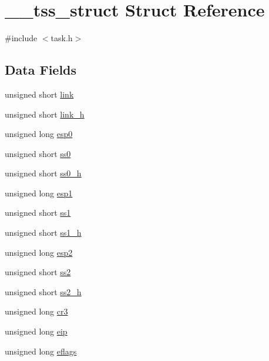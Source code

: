 \hypertarget{struct____tss__struct}{}\section{\+\_\+\+\_\+tss\+\_\+struct Struct Reference}
\label{struct____tss__struct}


{\ttfamily \#include $<$task.\+h$>$}

\subsection*{Data Fields}
\begin{DoxyCompactItemize}
\item 
unsigned short \hyperlink{struct____tss__struct_ae95a2fc5b42ac4b190cb4c340dfe0ab2}{link}
\item 
unsigned short \hyperlink{struct____tss__struct_a09d41cf0b65451fe0238b32ae9797bf0}{link\+\_\+h}
\item 
unsigned long \hyperlink{struct____tss__struct_a7d2c471a5e5070e75f2b11c70fa3374c}{esp0}
\item 
unsigned short \hyperlink{struct____tss__struct_a64d13cf91ec122ec8ed42917b9dd471b}{ss0}
\item 
unsigned short \hyperlink{struct____tss__struct_a06f3d0a7a04074ed8772d8ee810c9a38}{ss0\+\_\+h}
\item 
unsigned long \hyperlink{struct____tss__struct_a0c8844d2b2cd289b6d8b91cb37089592}{esp1}
\item 
unsigned short \hyperlink{struct____tss__struct_a1c405de895c4eb4ffe2930361aa252d3}{ss1}
\item 
unsigned short \hyperlink{struct____tss__struct_a3bbb779909ca09f2003bf80d78f62cbe}{ss1\+\_\+h}
\item 
unsigned long \hyperlink{struct____tss__struct_aae8e9f58e67ba8b83b7d9876885ff68b}{esp2}
\item 
unsigned short \hyperlink{struct____tss__struct_a38e2e31267942cf914f1f87e95e06152}{ss2}
\item 
unsigned short \hyperlink{struct____tss__struct_adef7bc907c882bdf83a27b682583f9cd}{ss2\+\_\+h}
\item 
unsigned long \hyperlink{struct____tss__struct_afd7f71893266af35fef0279fb2f9af42}{cr3}
\item 
unsigned long \hyperlink{struct____tss__struct_a5405817bf20081bfbd4007f146e787bd}{eip}
\item 
unsigned long \hyperlink{struct____tss__struct_ad0b672eea10bdec2d43cfee9f1ca5c4c}{eflags}

\end{DoxyCompactItemize}
